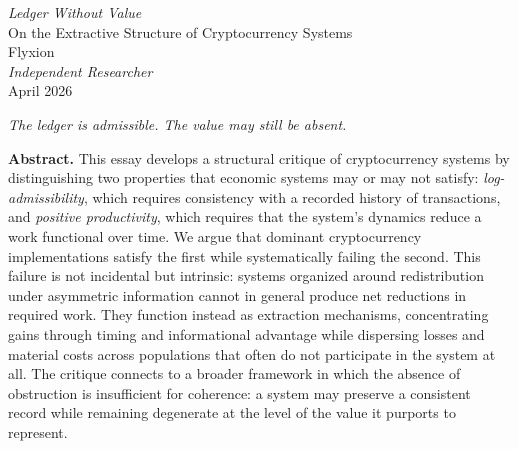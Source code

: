 \documentclass[12pt, oneside]{article}
\theoremstyle{definition}
\begin{document}
\begin{center}
  {\LARGE\itshape Ledger Without Value}\\[0.5em]
  {\large On the Extractive Structure of Cryptocurrency Systems}\\[1.4em]
  {\normalsize Flyxion}\\[0.2em]
  {\small\itshape Independent Researcher}\\[0.2em]
  {\small April 2026}
\end{center}

\vspace{0.8em}

\epigraph{\itshape The ledger is admissible. The value may still be absent.}{}

\vspace{1.2em}

\begin{center}
\begin{minipage}{0.88\textwidth}
\small{}
\textbf{Abstract.} This essay develops a structural critique of cryptocurrency systems by distinguishing two properties that economic systems may or may not satisfy: \emph{log-admissibility}, which requires consistency with a recorded history of transactions, and \emph{positive productivity}, which requires that the system's dynamics reduce a work functional over time. We argue that dominant cryptocurrency implementations satisfy the first while systematically failing the second. This failure is not incidental but intrinsic: systems organized around redistribution under asymmetric information cannot in general produce net reductions in required work. They function instead as extraction mechanisms, concentrating gains through timing and informational advantage while dispersing losses and material costs across populations that often do not participate in the system at all. The critique connects to a broader framework in which the absence of obstruction is insufficient for coherence: a system may preserve a consistent record while remaining degenerate at the level of the value it purports to represent.
\end{minipage}
\end{center}

\vspace{1.6em}

\end{document}
